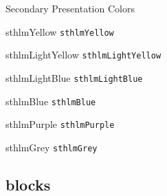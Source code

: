 \documentclass[compress]{beamer}
\begin{document}
\begin{frame}{Secondary Presentation Colors}
\begin{multicols}{2}
		\begin{beamercolorbox}[wd=\linewidth,ht=2ex,dp=0.7ex]{sthlmYellow}
			\texttt{sthlmYellow}
		\end{beamercolorbox}
		
		\begin{beamercolorbox}[wd=\linewidth,ht=2ex,dp=0.7ex]{sthlmLightYellow}
			\texttt{sthlmLightYellow}
		\end{beamercolorbox}
		
		\begin{beamercolorbox}[wd=\linewidth,ht=2ex,dp=0.7ex]{sthlmLightBlue}
			\texttt{sthlmLightBlue}
		\end{beamercolorbox}
		
		\begin{beamercolorbox}[wd=\linewidth,ht=2ex,dp=0.7ex]{sthlmBlue}
			\texttt{sthlmBlue}
		\end{beamercolorbox}
		
		\begin{beamercolorbox}[wd=\linewidth,ht=2ex,dp=0.7ex]{sthlmPurple}
			\texttt{sthlmPurple}
		\end{beamercolorbox}
		
		\begin{beamercolorbox}[wd=\linewidth,ht=2ex,dp=0.7ex]{sthlmGrey}
			\texttt{sthlmGrey}
		\end{beamercolorbox}
		
	\end{multicols}
\end{frame}

\subsection{blocks}

\end{document}
